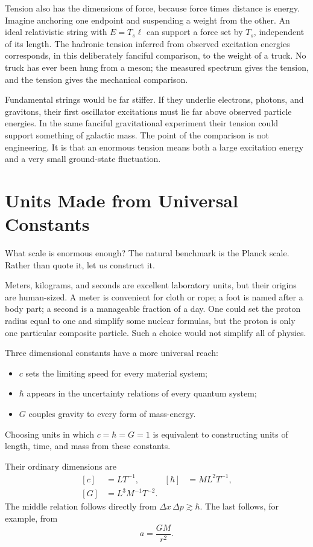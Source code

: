 Tension also has the dimensions of force, because force times distance is
energy. Imagine anchoring one endpoint and suspending a weight from the
other. An ideal relativistic string with \(E=T_s\ell\) can support a force
set by \(T_s\), independent of its length. The hadronic tension inferred from
observed excitation energies corresponds, in this deliberately fanciful
comparison, to the weight of a truck. No truck has ever been hung from a
meson; the measured spectrum gives the tension, and the tension gives the
mechanical comparison.

Fundamental strings would be far stiffer. If they underlie electrons,
photons, and gravitons, their first oscillator excitations must lie far above
observed particle energies. In the same fanciful gravitational experiment
their tension could support something of galactic mass. The point of the
comparison is not engineering. It is that an enormous tension means both a
large excitation energy and a very small ground-state fluctuation.

\section{Units Made from Universal Constants}

What scale is enormous enough? The natural benchmark is the Planck scale.
Rather than quote it, let us construct it.

Meters, kilograms, and seconds are excellent laboratory units, but their
origins are human-sized. A meter is convenient for cloth or rope; a foot is
named after a body part; a second is a manageable fraction of a day. One
could set the proton radius equal to one and simplify some nuclear formulas,
but the proton is only one particular composite particle. Such a choice
would not simplify all of physics.

Three dimensional constants have a more universal reach:
\begin{itemize}
  \item \(c\) sets the limiting speed for every material system;
  \item \(\hbar\) appears in the uncertainty relations of every quantum
  system;
  \item \(G\) couples gravity to every form of mass-energy.
\end{itemize}
Choosing units in which \(c=\hbar=G=1\) is equivalent to constructing units
of length, time, and mass from these constants.

Their ordinary dimensions are
\begin{equation}
  \begin{aligned}
    [c]&=LT^{-1},
    & [\hbar]&=ML^2T^{-1},\\
    [G]&=L^3M^{-1}T^{-2}.
  \end{aligned}
  \label{eq:l05-dimensions-constants}
\end{equation}
The middle relation follows directly from
\(\Delta x\,\Delta p\gtrsim\hbar\). The last follows, for example, from
\begin{equation}
  a=\frac{GM}{r^2}.
\end{equation}

